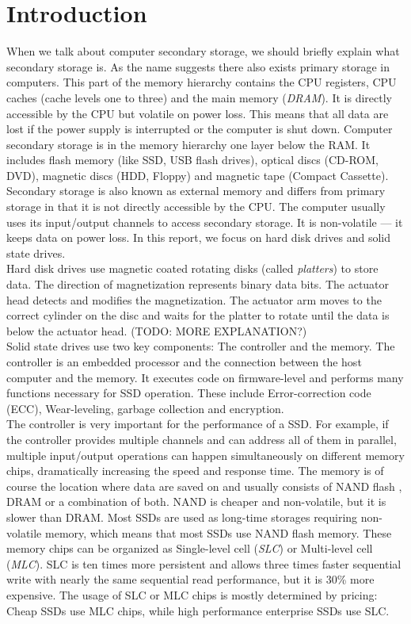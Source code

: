 \documentclass{acm_proc_article-sp}
\begin{document}
\section{Introduction}
When we talk about computer secondary storage, we should briefly explain what secondary storage is. As the name suggests there also exists primary storage in computers. This part of the memory hierarchy contains the CPU registers, CPU caches (cache levels one to three) and the main memory (\emph{DRAM}). It is directly accessible by the CPU but volatile on power loss. This means that all data are lost if the power supply is interrupted or the computer is shut down. Computer secondary storage is in the memory hierarchy one layer below the RAM. It includes flash memory (like SSD, USB flash drives), optical discs (CD-ROM, DVD), magnetic discs (HDD, Floppy) and magnetic tape (Compact Cassette). Secondary storage is also known as external memory and differs from primary storage in that it is not directly accessible by the CPU. The computer usually uses its input/output channels to access secondary storage. It is non-volatile --- it keeps data on power loss. In this report, we focus on hard disk drives and solid state drives.
\\
Hard disk drives use magnetic coated rotating disks (called \emph{platters}) to store data. The direction of magnetization represents binary data bits. The actuator head detects and modifies the magnetization. The actuator arm moves to the correct cylinder on the disc and waits for the platter to rotate until the data is below the actuator head. (TODO: MORE EXPLANATION?) 
\\
Solid state drives use two key components: The controller and the memory. The controller is an embedded processor and the connection between the host computer and the memory. It executes code on firmware-level and performs many functions necessary for SSD operation. These include Error-correction code (ECC), Wear-leveling, garbage collection and encryption.
\\
The controller is very important for the performance of a SSD. For example, if the controller provides multiple channels and can address all of them in parallel, multiple input/output operations can happen simultaneously on different memory chips, dramatically increasing the speed and response time. The memory is of course the location where data are saved on and usually consists of NAND flash , DRAM or a combination of both. NAND is cheaper and non-volatile, but it is slower than DRAM. Most SSDs are used as long-time storages requiring non-volatile memory, which means that most SSDs use NAND flash memory. These memory chips can be organized as Single-level cell (\emph{SLC}) or Multi-level cell (\emph{MLC}). SLC is ten times more persistent and allows three times faster sequential write with nearly the same sequential read performance, but it is 30\% more expensive. The usage of SLC or MLC chips is mostly determined by pricing: Cheap SSDs use MLC chips, while high performance enterprise SSDs use SLC.
\end{document}
